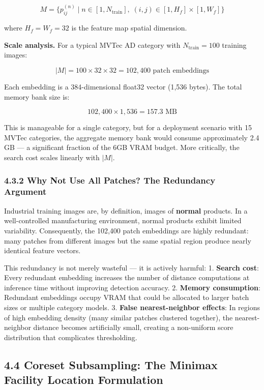 \documentclass[12pt, a4paper, oneside]{report}
\begin{document}
\[M = \{p_{ij}^{(n)} \mid n \in [1, N_{\text{train}}], \; (i,j) \in [1, H_f] \times [1, W_f]\}\]

where \(H_f = W_f = 32\) is the feature map spatial dimension.

\textbf{Scale analysis.} For a typical MVTec AD category with \(N_{\text{train}} = 100\) training images:

\[|M| = 100 \times 32 \times 32 = 102{,}400 \text{ patch embeddings}\]

Each embedding is a 384-dimensional float32 vector (1,536 bytes). The total memory bank size is:

\[102{,}400 \times 1{,}536 = 157.3 \text{ MB}\]

This is manageable for a single category, but for a deployment scenario with 15 MVTec categories, the aggregate memory bank would consume approximately 2.4 GB --- a significant fraction of the 6GB VRAM budget. More critically, the search cost scales linearly with \(|M|\).

\subsubsection{4.3.2 Why Not Use All Patches? The Redundancy Argument}\label{why-not-use-all-patches-the-redundancy-argument}

Industrial training images are, by definition, images of \textbf{normal} products. In a well-controlled manufacturing environment, normal products exhibit limited variability. Consequently, the 102,400 patch embeddings are highly redundant: many patches from different images but the same spatial region produce nearly identical feature vectors.

This redundancy is not merely wasteful --- it is actively harmful: 1. \textbf{Search cost}: Every redundant embedding increases the number of distance computations at inference time without improving detection accuracy. 2. \textbf{Memory consumption}: Redundant embeddings occupy VRAM that could be allocated to larger batch sizes or multiple category models. 3. \textbf{False nearest-neighbor effects}: In regions of high embedding density (many similar patches clustered together), the nearest-neighbor distance becomes artificially small, creating a non-uniform score distribution that complicates thresholding.

\bigskip\noindent\hrulefill\bigskip

\subsection{4.4 Coreset Subsampling: The Minimax Facility Location Formulation}\label{coreset-subsampling-the-minimax-facility-location-formulation}
\end{document}
